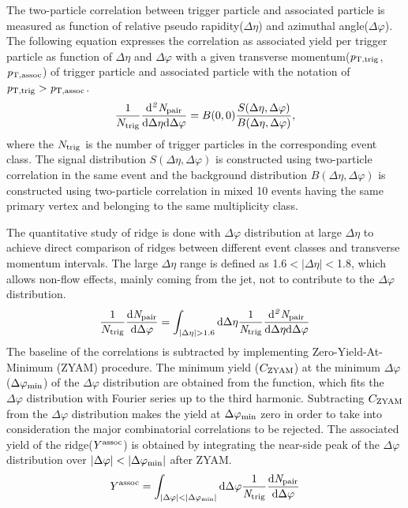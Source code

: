 The two-particle correlation between trigger particle and associated particle is measured as function of relative pseudo rapidity($\Delta\eta$) and azimuthal angle($\Delta\varphi$). The following equation expresses the correlation as associated yield per trigger particle as function of $\Delta\eta$ and $\Delta\varphi$ with a given transverse momentum($\it{p}_{\rm{T, trig}}$, $\it{p}_{\rm{T, assoc}}$) of trigger particle and associated particle with the notation of $\it{p}_{\rm{T, trig}} > \it{p}_{\rm{T, assoc}}$.
\begin{eqnarray}
\frac{1}{N_{\rm{trig}}} \frac{ \rm{d}\it{}^{2} N_{\rm{pair}} }{ \rm{d} \Delta\eta \rm{d}\Delta\varphi} = B(0, 0)\frac{S(\Delta\eta, \Delta\varphi)}{B(\Delta\eta, \Delta\varphi)},
\end{eqnarray}
where the $N_{\rm{trig}}$ is the number of trigger particles in the corresponding event class. The signal distribution $S(\Delta\eta, \Delta\varphi)$ is constructed using two-particle correlation in the same event and the background distribution $B(\Delta\eta, \Delta\varphi)$ is constructed using two-particle correlation in mixed 10 events having the same primary vertex and belonging to the same multiplicity class.

The quantitative study of ridge is done with $\Delta\varphi$ distribution at large $\Delta\eta$ to achieve direct comparison of ridges between different event classes and transverse momentum intervals. The large $\Delta\eta$ range is defined as 1.6$<|\Delta\eta|<$1.8, which allows non-flow effects, mainly coming from the jet, not to contribute to the $\Delta\varphi$ distribution.
\begin{eqnarray}
\frac{1}{N_{\rm{trig}}} \frac{ \rm{d}\it{}N_{\rm{pair}} }{ \rm{d}\Delta\varphi } = \int_{|\Delta \eta|>1.6} \rm{d} \Delta \eta \frac{1}{\it{N}_{\rm{trig}}} \frac{ \rm{d}\it{}^{2} N_{\rm{pair}} }{ \rm{d}\Delta\eta \rm{d}\Delta\varphi}
\end{eqnarray}
The baseline of the correlations is subtracted by implementing Zero-Yield-At-Minimum (ZYAM) procedure. The minimum yield ($C_{\rm{ZYAM}}$) at the minimum $\Delta\varphi$($\Delta\varphi_{\rm{min}}$) of the $\Delta\varphi$ distribution are obtained from the function, which fits the $\Delta\varphi$ distribution with Fourier series up to the third harmonic. Subtracting $C_{\rm{ZYAM}}$ from the $\Delta\varphi$ distribution makes the yield at $\Delta\varphi_{\rm{min}}$ zero in order to take into consideration the major combinatorial correlations to be rejected. The associated yield of the ridge($Y^{\rm{assoc}}$) is obtained by integrating the near-side peak of the $\Delta\varphi$ distribution over $|\Delta\varphi|<|\Delta\varphi_{\rm{min}}|$ after ZYAM.
\begin{eqnarray}
Y^{\rm{assoc}} = \int_{|\Delta \varphi| < |\Delta\varphi_{\rm{min}}| } \rm{d} \Delta\varphi \frac{1}{\it{N}_{\rm{trig}}} \frac{ \rm{d}\it{}N_{\rm{pair}} }{ \rm{d}\Delta\varphi } 
\end{eqnarray}

